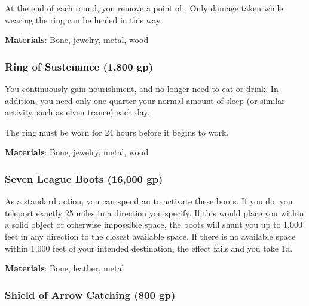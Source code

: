 At the end of each round, you remove a point of .
Only damage taken while wearing the ring can be healed in this way.



\vspace{0.25em}
\textbf{Materials}: Bone, jewelry, metal, wood


\lowercase{\hypertarget{item:Ring of Sustenance}{}}\label{item:Ring of Sustenance}
\hypertarget{item:Ring of Sustenance}{\subsubsection{Ring of Sustenance\hfill{} (1,800 gp)}}

You continuously gain nourishment, and no longer need to eat or drink.
In addition, you need only one-quarter your normal amount of sleep (or similar activity, such as elven trance) each day.

The ring must be worn for 24 hours before it begins to work.



\vspace{0.25em}
\textbf{Materials}: Bone, jewelry, metal, wood


\lowercase{\hypertarget{item:Seven League Boots}{}}\label{item:Seven League Boots}
\hypertarget{item:Seven League Boots}{\subsubsection{Seven League Boots\hfill{} (16,000 gp)}}

As a standard action, you can spend an  to activate these boots.
If you do, you teleport exactly 25 miles in a direction you specify.
If this would place you within a solid object or otherwise impossible space, the boots will shunt you up to 1,000 feet in any direction to the closest available space.
If there is no available space within 1,000 feet of your intended destination, the effect fails and you take  \minus1d.



\vspace{0.25em}
\textbf{Materials}: Bone, leather, metal


\lowercase{\hypertarget{item:Shield of Arrow Catching}{}}\label{item:Shield of Arrow Catching}
\hypertarget{item:Shield of Arrow Catching}{\subsubsection{Shield of Arrow Catching\hfill{} (800 gp)}}

